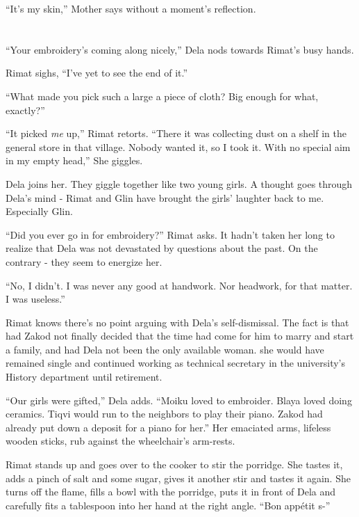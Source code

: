 \documentclass[twoside,11pt]{book}
\begin{document}
``It's my skin,'' Mother says without a moment's reflection.



\chapter{}

``Your embroidery's coming along nicely,'' Dela nods towards Rimat's busy hands.

Rimat sighs, ``I've yet to see the end of it.''

``What made you pick such a large a piece of cloth? Big enough for what, exactly?''

``It picked \textit{me} up,'' Rimat retorts. ``There it was collecting dust on a
shelf in the general store in that village. Nobody wanted it, so I took it. With no special aim in my empty
head,'' She giggles.

Dela joins her. They giggle together like two young girls. A thought goes through Dela's mind - Rimat and Glin have
brought the girls' laughter back to me. Especially Glin.

``Did you ever go in for embroidery?'' Rimat asks. It hadn't taken her long to realize that
Dela was not devastated by questions about the past. On the contrary - they seem to energize her.

``No, I didn't. I was never any good at handwork. Nor headwork, for that matter. I was
useless.''

Rimat knows there's no point arguing with Dela's self-dismissal. The fact is that had Zakod not finally decided that the
time had come for him to marry and start a family, and had Dela not been the only available woman. she would have
remained single and continued working as technical secretary in the university's History department until retirement.

``Our girls were gifted,'' Dela adds. ``Moiku loved to embroider. Blaya loved
doing ceramics. Tiqvi would run to the neighbors to play their piano. Zakod had already put down a deposit for a piano
for her.'' Her emaciated arms, lifeless wooden sticks, rub against the wheelchair's arm-rests.

Rimat stands up and goes over to the cooker to stir the porridge. She tastes it, adds a pinch of salt and some sugar,
gives it another stir and tastes it again. She turns off the flame, fills a bowl with the porridge, puts it in front of
Dela and carefully fits a tablespoon into her hand at the right angle. ``Bon app\'etit s-''
\end{document}
